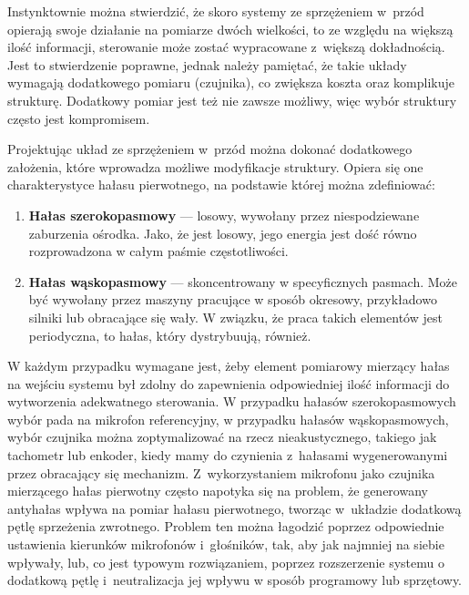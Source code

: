 Instynktownie można stwierdzić, że skoro systemy ze sprzężeniem w~przód opierają
swoje działanie na pomiarze dwóch wielkości, to ze względu na większą ilość
informacji, sterowanie może zostać wypracowane z~większą dokładnością. Jest to
stwierdzenie poprawne, jednak należy pamiętać, że takie układy wymagają
dodatkowego pomiaru (czujnika), co zwiększa koszta oraz komplikuje strukturę.
Dodatkowy pomiar jest też nie zawsze możliwy, więc wybór struktury często jest
kompromisem. \par Projektując układ ze sprzężeniem w~przód można dokonać
dodatkowego założenia, które wprowadza możliwe modyfikacje struktury. Opiera się
one charakterystyce hałasu pierwotnego, na podstawie której można zdefiniować: 

\begin{enumerate}

    \item \textbf{Hałas szerokopasmowy} --- losowy, wywołany przez
    niespodziewane zaburzenia ośrodka. Jako, że jest losowy, jego energia jest
    dość równo rozprowadzona w całym paśmie częstotliwości.
    
    \item \textbf{Hałas wąskopasmowy} --- skoncentrowany w specyficznych
    pasmach. Może być wywołany przez maszyny pracujące w sposób okresowy,
    przykładowo silniki lub obracające się wały. W związku, że praca takich
    elementów jest periodyczna, to hałas, który dystrybuują, również.

\end{enumerate}

W każdym przypadku wymagane jest, żeby element pomiarowy mierzący hałas na
wejściu systemu był zdolny do zapewnienia odpowiedniej ilość informacji do
wytworzenia adekwatnego sterowania. W przypadku hałasów szerokopasmowych wybór
pada na mikrofon referencyjny, w przypadku hałasów wąskopasmowych, wybór
czujnika można zoptymalizować na rzecz nieakustycznego, takiego jak tachometr
lub enkoder, kiedy mamy do czynienia z~hałasami wygenerowanymi przez obracający
się mechanizm. Z~wykorzystaniem mikrofonu jako czujnika mierzącego hałas
pierwotny często napotyka się na problem, że generowany antyhałas wpływa na
pomiar hałasu pierwotnego, tworząc w~układzie dodatkową pętlę sprzeżenia
zwrotnego. Problem ten można łagodzić poprzez odpowiednie ustawienia kierunków
mikrofonów i~głośników, tak, aby jak najmniej na siebie wpływały, lub, co jest
typowym rozwiązaniem, poprzez rozszerzenie systemu o dodatkową pętlę
i~neutralizacja jej wpływu w sposób programowy lub sprzętowy.

